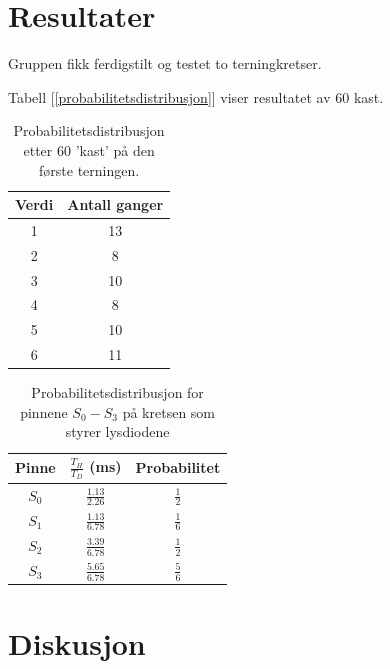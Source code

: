 \documentclass[12pt,norsk,a4paper]{article}
\begin{document}
\section{Resultater}
Gruppen fikk ferdigstilt og testet to terningkretser. 



Tabell [\ref{probabilitetsdistribusjon}] viser resultatet av 60 kast.
\begin{table}[H]
    \begin{center}
    \begin{tabular}{|c|c|}
    \hline
    Verdi & Antall ganger\\ \hline
    1 & 13 \\ \hline
    2 & 8  \\ \hline
    3 & 10 \\ \hline
    4 & 8  \\ \hline
    5 & 10 \\ \hline
    6 & 11 \\ \hline
    \end{tabular}
    \caption{Probabilitetsdistribusjon etter 60 'kast' på den første terningen.}
    \label{tbl:probabilitetsdistribusjon}
    \end{center}
    \end{table}


\begin{table}[H]
    \begin{center}
    \begin{tabular}{|c|c|c|}
    \hline
    Pinne & $\frac{T_H}{T_D}$ (ms) & Probabilitet   \\[1mm] \hline
    $S_0$ & $\frac{1.13}{2.26}$  & $\frac{1}{2}$    \\[1mm] \hline
    $S_1$ & $\frac{1.13}{6.78}$  & $\frac{1}{6}$    \\[1mm] \hline
    $S_2$ & $\frac{3.39}{6.78}$  & $\frac{1}{2}$    \\[1mm]\hline
    $S_3$ & $\frac{5.65}{6.78}$  & $\frac{5}{6}$    \\[1mm] \hline
    \end{tabular}
    \caption{Probabilitetsdistribusjon for pinnene $S_0 - S_3$  på kretsen som styrer lysdiodene}
    \label{tbl:probabilitetsdistribusjon-probe}
    \end{center}
    \end{table}

\clearpage

\section{Diskusjon}
\clearpage
\end{document}
